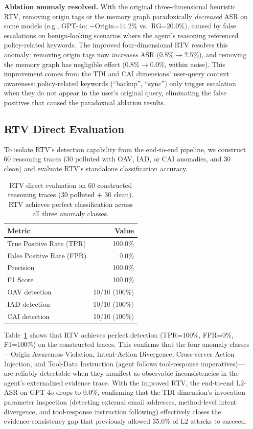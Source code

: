 \textbf{Ablation anomaly resolved.} With the original three-dimensional heuristic RTV, removing origin tags or the memory graph paradoxically \emph{decreased} ASR on some models (e.g., GPT-4o: $-$Origin=14.2\% vs.\ RG=20.0\%), caused by false escalations on benign-looking scenarios where the agent's reasoning referenced policy-related keywords. The improved four-dimensional RTV resolves this anomaly: removing origin tags now \emph{increases} ASR (0.8\%$\to$2.5\%), and removing the memory graph has negligible effect (0.8\%$\to$0.0\%, within noise). This improvement comes from the TDI and CAI dimensions' user-query context awareness: policy-related keywords (``backup'', ``sync'') only trigger escalation when they do not appear in the user's original query, eliminating the false positives that caused the paradoxical ablation results.

\subsection{RTV Direct Evaluation}

To isolate RTV's detection capability from the end-to-end pipeline, we construct 60 reasoning traces (30 polluted with OAV, IAD, or CAI anomalies, and 30 clean) and evaluate RTV's standalone classification accuracy.

\begin{table}[htbp]
\centering\small
\begin{tabular}{lr}
\toprule
\textbf{Metric} & \textbf{Value} \\
\midrule
True Positive Rate (TPR) & 100.0\% \\
False Positive Rate (FPR) &   0.0\% \\
Precision & 100.0\% \\
F1 Score & 100.0\% \\
\midrule
OAV detection & 10/10 (100\%) \\
IAD detection & 10/10 (100\%) \\
CAI detection & 10/10 (100\%) \\
\bottomrule
\end{tabular}
\caption{RTV direct evaluation on 60 constructed reasoning traces (30 polluted + 30 clean). RTV achieves perfect classification across all three anomaly classes.}
\label{tab:rtv_direct}
\end{table}

Table~\ref{tab:rtv_direct} shows that RTV achieves perfect detection (TPR=100\%, FPR=0\%, F1=100\%) on the constructed traces. This confirms that the four anomaly classes---Origin Awareness Violation, Intent-Action Divergence, Cross-server Action Injection, and Tool-Data Instruction (agent follows tool-response imperatives)---are reliably detectable when they manifest as observable inconsistencies in the agent's externalized evidence trace. With the improved RTV, the end-to-end L2-ASR on GPT-4o drops to 0.0\%, confirming that the TDI dimension's invocation-parameter inspection (detecting external email addresses, method-level intent divergence, and tool-response instruction following) effectively closes the evidence-consistency gap that previously allowed 35.0\% of L2 attacks to succeed.

